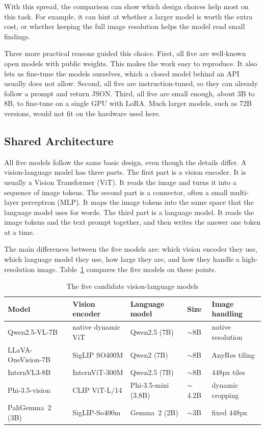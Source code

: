\documentclass[a4paper,12pt]{report}
\begin{document}
With this spread, the comparison can show which design choices help most on this task. For example, it can hint at whether a larger model is worth the extra cost, or whether keeping the full image resolution helps the model read small findings.

Three more practical reasons guided this choice. First, all five are well-known open models with public weights. This makes the work easy to reproduce. It also lets us fine-tune the models ourselves, which a closed model behind an API usually does not allow. Second, all five are instruction-tuned, so they can already follow a prompt and return JSON. Third, all five are small enough, about 3B to 8B, to fine-tune on a single GPU with LoRA. Much larger models, such as 72B versions, would not fit on the hardware used here.

\subsection{Shared Architecture}

All five models follow the same basic design, even though the details differ. A vision-language model has three parts. The first part is a vision encoder. It is usually a Vision Transformer (ViT). It reads the image and turns it into a sequence of image tokens. The second part is a connector, often a small multi-layer perceptron (MLP). It maps the image tokens into the same space that the language model uses for words. The third part is a language model. It reads the image tokens and the text prompt together, and then writes the answer one token at a time.

The main differences between the five models are: which vision encoder they use, which language model they use, how large they are, and how they handle a high-resolution image. Table~\ref{tab:vlm-summary} compares the five models on these points.

\begin{table}[H]
\centering
\caption{The five candidate vision-language models}
\label{tab:vlm-summary}
\begin{tabular}{lllll}
\toprule
Model & Vision encoder & Language model & Size & Image handling \\
\midrule
Qwen2.5-VL-7B      & native dynamic ViT   & Qwen2.5 (7B)      & $\sim$8B  & native resolution \\
LLaVA-OneVision-7B & SigLIP SO400M        & Qwen2 (7B)        & $\sim$8B  & AnyRes tiling \\
InternVL3-8B       & InternViT-300M       & Qwen2.5 (7B)      & $\sim$8B  & 448px tiles \\
Phi-3.5-vision     & CLIP ViT-L/14        & Phi-3.5-mini (3.8B) & $\sim$4.2B & dynamic cropping \\
PaliGemma~2 (3B)   & SigLIP-So400m        & Gemma~2 (2B)      & $\sim$3B  & fixed 448px \\
\bottomrule
\end{tabular}
\end{table}
\end{document}
